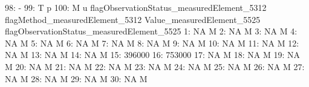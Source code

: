 \documentclass[nojss]{jss}
\begin{document}
\begin{Schunk}
\begin{Soutput}
 98:                                                                          -
 99:                                          T                               p
100:                                          M                               u
     flagObservationStatus_measuredElement_5312 flagMethod_measuredElement_5312
     Value_measuredElement_5525 flagObservationStatus_measuredElement_5525
  1:                         NA                                          M
  2:                         NA                                          M
  3:                         NA                                          M
  4:                         NA                                          M
  5:                         NA                                          M
  6:                         NA                                          M
  7:                         NA                                          M
  8:                         NA                                          M
  9:                         NA                                          M
 10:                         NA                                          M
 11:                         NA                                          M
 12:                         NA                                          M
 13:                         NA                                          M
 14:                         NA                                          M
 15:                     396000                                           
 16:                     753000                                           
 17:                         NA                                          M
 18:                         NA                                          M
 19:                         NA                                          M
 20:                         NA                                          M
 21:                         NA                                          M
 22:                         NA                                          M
 23:                         NA                                          M
 24:                         NA                                          M
 25:                         NA                                          M
 26:                         NA                                          M
 27:                         NA                                          M
 28:                         NA                                          M
 29:                         NA                                          M
 30:                         NA                                          M

\end{Soutput}
\end{Schunk}
\end{document}
